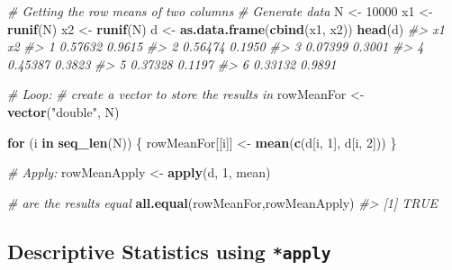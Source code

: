 \documentclass[]{book}
\makeatletter
\newenvironment{Shaded}{\begin{snugshade}}{\end{snugshade}}
\newcommand{\KeywordTok}[1]{\textcolor[rgb]{0.13,0.29,0.53}{\textbf{#1}}}
\newcommand{\DecValTok}[1]{\textcolor[rgb]{0.00,0.00,0.81}{#1}}
\newcommand{\StringTok}[1]{\textcolor[rgb]{0.31,0.60,0.02}{#1}}
\newcommand{\CommentTok}[1]{\textcolor[rgb]{0.56,0.35,0.01}{\textit{#1}}}
\newcommand{\ControlFlowTok}[1]{\textcolor[rgb]{0.13,0.29,0.53}{\textbf{#1}}}
\newcommand{\NormalTok}[1]{#1}
\newenvironment{kframe}{%
\medskip{}
\setlength{\fboxsep}{.8em}
 \def\at@end@of@kframe{}%
 \ifinner\ifhmode%
  \def\at@end@of@kframe{\end{minipage}}%
  \begin{minipage}{\columnwidth}%
 \fi\fi%
 \def\FrameCommand##1{\hskip\@totalleftmargin \hskip-\fboxsep
 \colorbox{shadecolor}{##1}\hskip-\fboxsep
     \hskip-\linewidth \hskip-\@totalleftmargin \hskip\columnwidth}%
 \MakeFramed {\advance\hsize-\width
   \@totalleftmargin\z@ \linewidth\hsize
   \@setminipage}}%
 {\par\unskip\endMakeFramed%
 \at@end@of@kframe}
\renewenvironment{Shaded}{\begin{kframe}}{\end{kframe}}
\theoremstyle{definition}
\theoremstyle{definition}
\theoremstyle{definition}
\theoremstyle{remark}
\makeatother
\begin{document}
\begin{Shaded}
\begin{Highlighting}[]

\CommentTok{# Getting the row means of two columns}
\CommentTok{# Generate data}
\NormalTok{N <-}\StringTok{ }\DecValTok{10000}
\NormalTok{x1 <-}\StringTok{ }\KeywordTok{runif}\NormalTok{(N)}
\NormalTok{x2 <-}\StringTok{ }\KeywordTok{runif}\NormalTok{(N)}
\NormalTok{d <-}\StringTok{ }\KeywordTok{as.data.frame}\NormalTok{(}\KeywordTok{cbind}\NormalTok{(x1, x2))}
\KeywordTok{head}\NormalTok{(d)}
\CommentTok{#>        x1     x2}
\CommentTok{#> 1 0.57632 0.9615}
\CommentTok{#> 2 0.56474 0.1950}
\CommentTok{#> 3 0.07399 0.3001}
\CommentTok{#> 4 0.45387 0.3823}
\CommentTok{#> 5 0.37328 0.1197}
\CommentTok{#> 6 0.33132 0.9891}

\CommentTok{# Loop:}
\CommentTok{# create a vector to store the results in }
\NormalTok{rowMeanFor <-}\StringTok{ }\KeywordTok{vector}\NormalTok{(}\StringTok{"double"}\NormalTok{, N)}

\ControlFlowTok{for}\NormalTok{ (i }\ControlFlowTok{in} \KeywordTok{seq_len}\NormalTok{(N)) \{}
\NormalTok{        rowMeanFor[[i]] <-}\StringTok{ }\KeywordTok{mean}\NormalTok{(}\KeywordTok{c}\NormalTok{(d[i, }\DecValTok{1}\NormalTok{], d[i, }\DecValTok{2}\NormalTok{]))}
\NormalTok{\}}

\CommentTok{# Apply:}
\NormalTok{rowMeanApply <-}\StringTok{ }\KeywordTok{apply}\NormalTok{(d, }\DecValTok{1}\NormalTok{, mean)}

\CommentTok{# are the results equal}
\KeywordTok{all.equal}\NormalTok{(rowMeanFor,rowMeanApply)}
\CommentTok{#> [1] TRUE}
\end{Highlighting}
\end{Shaded}

\subsection{\texorpdfstring{Descriptive Statistics using
\texttt{*apply}}{Descriptive Statistics using *apply}}\label{descriptive-statistics-using-apply}
\end{document}
